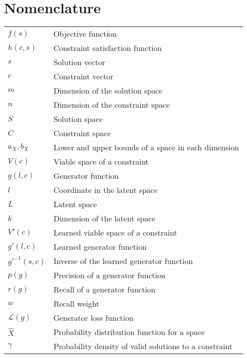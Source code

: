 \documentclass[../main.tex]{subfiles}
\begin{document}
\chapter*{Nomenclature}

\begin{tabular}{ l l }
    $f(s)$ & Objective function \\ 
    $h(c, s)$ & Constraint satisfaction function \\  
    $s$ & Solution vector \\
    $c$ & Constraint vector \\
    $m$ & Dimension of the solution space \\
    $n$ & Dimension of the constraint space \\
    $S$ & Solution space \\
    $C$ & Constraint space \\
    $a_X, b_X$ & Lower and upper bounds of a space in each dimension \\
    $V(c)$ & Viable space of a constraint \\
    $g(l, c)$ & Generator function \\
    $l$ & Coordinate in the latent space \\
    $L$ & Latent space \\
    $k$ & Dimension of the latent space \\
    $V'(c)$ & Learned viable space of a constraint \\
    $g'(l, c)$ & Learned generator function \\
    $g'^{-1}(s, c)$ & Inverse of the learned generator function \\
    $p(g)$ & Precision of a generator function \\
    $r(g)$ & Recall of a generator function \\
    $w$ & Recall weight \\
    $\mathcal{L}(g)$ & Generator loss function \\
    $\hat{X}$ & Probability distribution function for a space \\
    $\gamma$ & Probability density of valid solutions to a constraint \\
\end{tabular}
\end{document}
